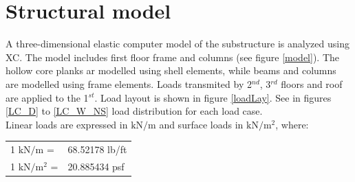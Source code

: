 \section{Structural model}
A three-dimensional elastic computer model of the substructure is analyzed using XC. The model includes first floor frame and columns (see figure \ref{model}). The hollow core planks ar modelled using shell elements, while beams and columns are modelled using frame elements. Loads transmited by 2$^{nd}$, 3$^{rd}$ floors and roof are applied to the 1$^{st}$. Load layout is shown in figure \ref{loadLay}. See in figures \ref{LC_D} to \ref{LC_W_NS} load distribution for each load case.\\

Linear loads are expressed in $\mathrm{kN/m}$ and surface loads in $\mathrm{kN/m^2}$, where:\\
\begin{center}
  \begin{tabular}{ll}
    1 $\mathrm{kN/m}$ = & 68.52178 lb/ft \\
    1 $\mathrm{kN/m^2}$ = & 20.885434 psf \\
  \end{tabular}
  \end{center}


